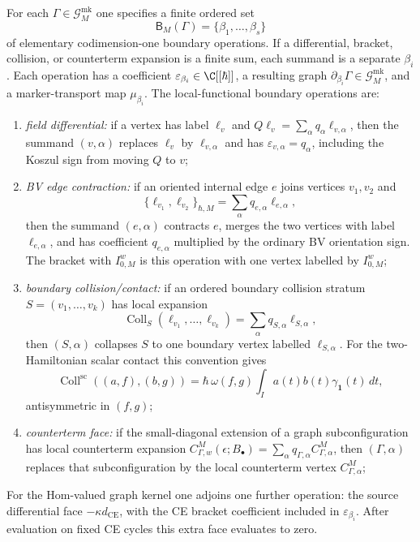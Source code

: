 \begin{defn}
  For each \(\Gamma\in\mathcal G^{\mathrm{mk}}_M\) one specifies a finite
  ordered set
  \[
    \mathsf B_M(\Gamma)=\{\beta_1,\ldots,\beta_s\}
  \]
  of elementary codimension-one boundary operations.  If a differential,
  bracket, collision, or counterterm expansion is a finite sum, each
  summand is a separate \(\beta_i\).  Each operation has a coefficient
  \(\varepsilon_{\beta_i}\in\C[[\hbar]]\), a resulting graph
  \(\partial_{\beta_i}\Gamma\in\mathcal G^{\mathrm{mk}}_M\), and a
  marker-transport map \(\mu_{\beta_i}\).  The local-functional boundary
  operations are:
  \begin{enumerate}[label=(B\arabic*)]
    \item \emph{field differential:} if a vertex has label \(\ell_v\) and
    \(Q\ell_v=\sum_\alpha q_\alpha\ell_{v,\alpha}\), then the summand
    \((v,\alpha)\) replaces \(\ell_v\) by \(\ell_{v,\alpha}\) and has
    \(\varepsilon_{v,\alpha}=q_\alpha\), including the Koszul sign from
    moving \(Q\) to \(v\);
    \item \emph{BV edge contraction:} if an oriented internal edge \(e\)
    joins vertices \(v_1,v_2\) and
    \[
      \{\ell_{v_1},\ell_{v_2}\}_{\hbar,M}
        =
      \sum_\alpha q_{e,\alpha}\ell_{e,\alpha},
    \]
    then the summand \((e,\alpha)\) contracts \(e\), merges the two
    vertices with label \(\ell_{e,\alpha}\), and has coefficient
    \(q_{e,\alpha}\) multiplied by the ordinary BV orientation sign.  The
    bracket with \(I^w_{0,M}\) is this operation with one vertex labelled
    by \(I^w_{0,M}\);
    \item \emph{boundary collision/contact:} if an ordered boundary
    collision stratum \(S=(v_1,\ldots,v_k)\) has local expansion
    \[
      \operatorname{Coll}_{S}(\ell_{v_1},\ldots,\ell_{v_k})
        =
      \sum_\alpha q_{S,\alpha}\ell_{S,\alpha},
    \]
    then \((S,\alpha)\) collapses \(S\) to one boundary vertex labelled
    \(\ell_{S,\alpha}\).  For the two-Hamiltonian scalar contact this
    convention gives
    \[
      \operatorname{Coll}^{\mathrm{sc}}((a,f),(b,g))
        =
      \hbar\,\omega(f,g)\int_I a(t)b(t)\gamma_{\mathbf 1}(t)\,dt,
    \]
    antisymmetric in \((f,g)\);
    \item \emph{counterterm face:} if the small-diagonal extension of a
    graph subconfiguration has local counterterm expansion
    \(C^M_{\Gamma,w}(\epsilon;B_\bullet)=
    \sum_\alpha q_{\Gamma,\alpha}C^M_{\Gamma,\alpha}\), then
    \((\Gamma,\alpha)\) replaces that subconfiguration by the local
    counterterm vertex \(C^M_{\Gamma,\alpha}\);
  \end{enumerate}
  For the Hom-valued graph kernel one adjoins one further operation:
  the source differential face \(-\kappa d_{\mathrm{CE}}\), with the CE
  bracket coefficient included in \(\varepsilon_{\beta_i}\).  After
  evaluation on fixed CE cycles this extra face evaluates to zero.


\end{defn}
